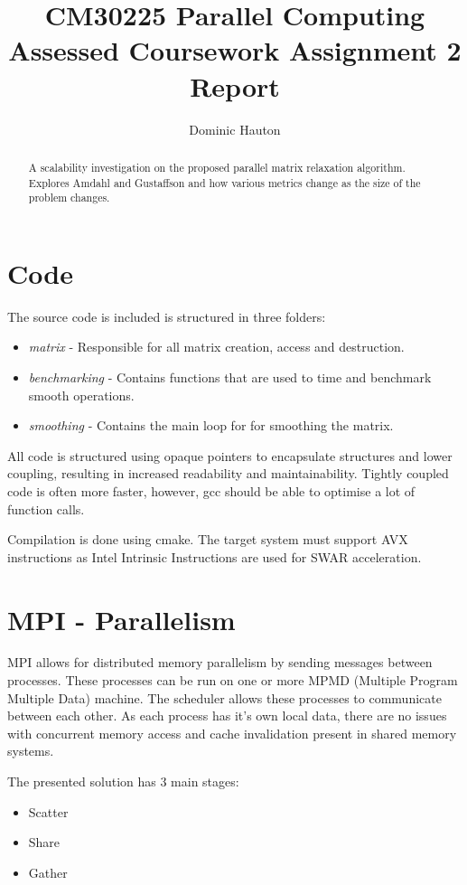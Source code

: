 \documentclass[a4paper,10pt]{report}
\title{CM30225 Parallel Computing\\Assessed Coursework Assignment 2\\Report}
\author{Dominic Hauton}
\begin{document}
\maketitle

\begin{abstract}
A scalability investigation on the proposed parallel matrix relaxation algorithm. Explores Amdahl and Gustaffson and how various metrics change as the size of the problem changes.
\end{abstract}

\section{Code}

The source code is included is structured in three folders:
\begin{itemize}
 \item \emph{matrix} - Responsible for all matrix creation, access and destruction.
 \item \emph{benchmarking} - Contains functions that are used to time and benchmark smooth operations.
 \item \emph{smoothing} - Contains the main loop for for smoothing the matrix.
\end{itemize}
All code is structured using opaque pointers to encapsulate structures and lower coupling, resulting in increased readability and maintainability. Tightly coupled code is often more faster, however, gcc should be able to optimise a lot of function calls.

Compilation is done using cmake. The target system must support AVX instructions as Intel Intrinsic Instructions are used for SWAR acceleration.

\section{MPI - Parallelism}

MPI allows for distributed memory parallelism by sending messages between processes. These processes can be run on one or more MPMD (Multiple Program Multiple Data) machine. The scheduler allows these processes to communicate between each other. As each process has it's own local data, there are no issues with concurrent memory access and cache invalidation present in shared memory systems.\par
The presented solution has 3 main stages:
\begin{itemize}
 \item Scatter
 \item Share
 \item Gather
\end{itemize}\par
\end{document}
